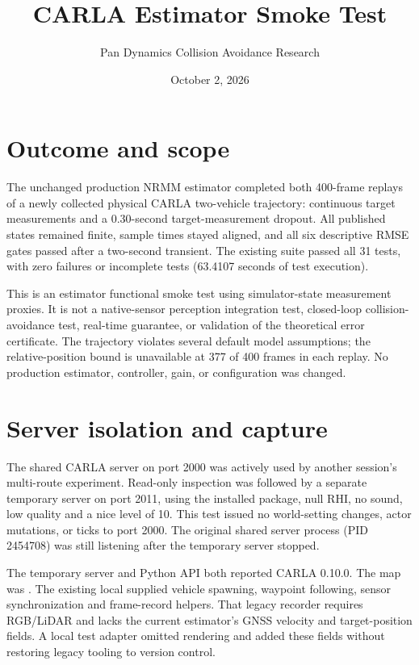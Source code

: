 \documentclass[11pt]{article}
\title{CARLA Estimator Smoke Test}
\author{Pan Dynamics Collision Avoidance Research}
\date{October 2, 2026}
\begin{document}
\maketitle

\section{Outcome and scope}
The unchanged production NRMM estimator completed both 400-frame replays of
a newly collected physical CARLA two-vehicle trajectory: continuous target
measurements and a 0.30-second target-measurement dropout. All published
states remained finite, sample times stayed aligned, and all six descriptive
RMSE gates passed after a two-second transient. The existing
 suite passed all 31 tests, with
zero failures or incomplete tests (63.4107 seconds of test execution).

This is an estimator functional smoke test using simulator-state measurement
proxies. It is not a native-sensor perception integration test, closed-loop
collision-avoidance test, real-time guarantee, or validation of the theoretical
error certificate. The trajectory violates several default model assumptions;
the relative-position bound is unavailable at 377 of 400 frames in each replay.
No production estimator, controller, gain, or configuration was changed.

\section{Server isolation and capture}
The shared CARLA server on port 2000 was actively used by another session's
multi-route experiment. Read-only inspection was followed by a separate
temporary server on port 2011, using the installed package, null RHI, no sound,
low quality and a nice level of 10. This test issued no world-setting changes,
actor mutations, or ticks to port 2000. The original shared server process
(PID 2454708) was still listening after the temporary server stopped.

The temporary server and Python API both reported CARLA 0.10.0. The map was
. The existing local
 supplied vehicle spawning,
waypoint following, sensor synchronization and frame-record helpers. That
legacy recorder requires RGB/LiDAR and lacks the current estimator's GNSS
velocity and target-position fields. A local test adapter omitted rendering
and added these fields without restoring legacy tooling to version control.
\end{document}
